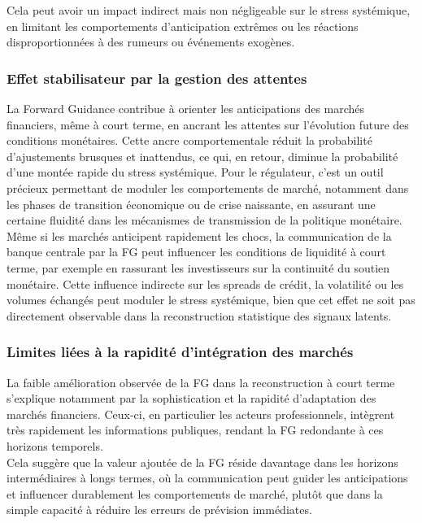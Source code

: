 Cela peut avoir un impact indirect mais non négligeable sur le stress systémique, en limitant les comportements d’anticipation extrêmes ou les réactions disproportionnées à des rumeurs ou événements exogènes.

\subsubsection{Effet stabilisateur par la gestion des attentes}

La Forward Guidance contribue à orienter les anticipations des marchés financiers, même à court terme, en ancrant les attentes sur l’évolution future des conditions monétaires. Cette ancre comportementale réduit la probabilité d’ajustements brusques et inattendus, ce qui, en retour, diminue la probabilité d’une montée rapide du stress systémique. Pour le régulateur, c’est un outil précieux permettant de moduler les comportements de marché, notamment dans les phases de transition économique ou de crise naissante, en assurant une certaine fluidité dans les mécanismes de transmission de la politique monétaire.\\

Même si les marchés anticipent rapidement les chocs, la communication de la banque centrale par la FG peut influencer les conditions de liquidité à court terme, par exemple en rassurant les investisseurs sur la continuité du soutien monétaire. Cette influence indirecte sur les spreads de crédit, la volatilité ou les volumes échangés peut moduler le stress systémique, bien que cet effet ne soit pas directement observable dans la reconstruction statistique des signaux latents.

\subsubsection{Limites liées à la rapidité d’intégration des marchés}

La faible amélioration observée de la FG dans la reconstruction à court terme s’explique notamment par la sophistication et la rapidité d’adaptation des marchés financiers. Ceux-ci, en particulier les acteurs professionnels, intègrent très rapidement les informations publiques, rendant la FG redondante à ces horizons temporels.\\

Cela suggère que la valeur ajoutée de la FG réside davantage dans les horizons intermédiaires à longs termes, où la communication peut guider les anticipations et influencer durablement les comportements de marché, plutôt que dans la simple capacité à réduire les erreurs de prévision immédiates.

